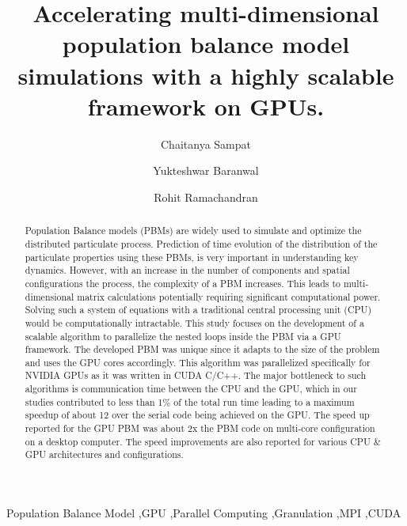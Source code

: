 \documentclass[preprint,10pt,authoryear,review]{elsarticle}
\begin{document}
\begin{frontmatter}
\title{Accelerating multi-dimensional population balance model simulations with a highly scalable framework on GPUs.}


\author[label1]{Chaitanya Sampat}
\author[label1]{Yukteshwar Baranwal}
\address[label1]{Chemical and Biochemical Engineering, 
Rutgers University, Piscataway, NJ, USA - 08854}
\author[label1]{Rohit Ramachandran}

\begin{abstract}
Population Balance models (PBMs) are widely used to simulate and optimize the 
distributed particulate process. Prediction of time evolution of the distribution 
of the particulate properties using these PBMs, is very important in understanding
key dynamics. However, with an increase in the number of components and spatial 
configurations the process, the complexity of a PBM increases. This leads to 
multi-dimensional matrix calculations potentially requiring significant 
computational power. Solving such a system of equations with a traditional 
central processing unit (CPU) would be computationally intractable.
This study focuses on the development of a scalable algorithm to parallelize the nested 
loops inside the PBM via a GPU framework. The developed PBM was unique since it adapts 
to the size of the problem and uses the GPU cores accordingly. This algorithm was 
parallelized specifically for NVIDIA GPUs as it was written in CUDA C/C++. The major 
bottleneck to such algorithms is communication time between the CPU and the GPU, which 
in our studies contributed to less than 1\% of the total run time leading to a 
maximum speedup of about 12 over the serial code being achieved on the GPU. 
The speed up reported for the GPU PBM was about 2x the PBM code on multi-core 
configuration on a desktop computer. The speed improvements are also reported for 
various CPU \& GPU architectures and configurations.
\end{abstract}

\begin{keyword}
Population Balance Model \sep GPU \sep Parallel Computing \sep Granulation \sep MPI \sep CUDA
\end{keyword}

\end{frontmatter}
\end{document}
